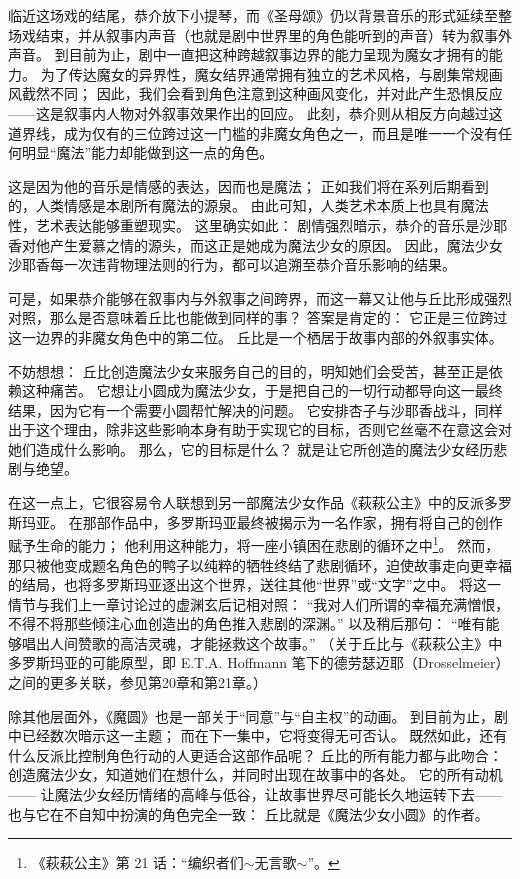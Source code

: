 临近这场戏的结尾，恭介放下小提琴，而《圣母颂》仍以背景音乐的形式延续至整场戏结束，并从叙事内声音（也就是剧中世界里的角色能听到的声音）转为叙事外声音。
到目前为止，剧中一直把这种跨越叙事边界的能力呈现为魔女才拥有的能力。
为了传达魔女的异界性，魔女结界通常拥有独立的艺术风格，与剧集常规画风截然不同；
因此，我们会看到角色注意到这种画风变化，并对此产生恐惧反应——这是叙事内人物对外叙事效果作出的回应。
此刻，恭介则从相反方向越过这道界线，成为仅有的三位跨过这一门槛的非魔女角色之一，而且是唯一一个没有任何明显“魔法”能力却能做到这一点的角色。

这是因为他的音乐是情感的表达，因而也是魔法；
正如我们将在系列后期看到的，人类情感是本剧所有魔法的源泉。
由此可知，人类艺术本质上也具有魔法性，艺术表达能够重塑现实。
这里确实如此：
剧情强烈暗示，恭介的音乐是沙耶香对他产生爱慕之情的源头，而这正是她成为魔法少女的原因。
因此，魔法少女沙耶香每一次违背物理法则的行为，都可以追溯至恭介音乐影响的结果。

可是，如果恭介能够在叙事内与外叙事之间跨界，而这一幕又让他与丘比形成强烈对照，那么是否意味着丘比也能做到同样的事？
答案是肯定的：
它正是三位跨过这一边界的非魔女角色中的第二位。
丘比是一个栖居于故事内部的外叙事实体。

不妨想想：
丘比创造魔法少女来服务自己的目的，明知她们会受苦，甚至正是依赖这种痛苦。
它想让小圆成为魔法少女，于是把自己的一切行动都导向这一最终结果，因为它有一个需要小圆帮忙解决的问题。
它安排杏子与沙耶香战斗，同样出于这个理由，除非这些影响本身有助于实现它的目标，否则它丝毫不在意这会对她们造成什么影响。
那么，它的目标是什么？
就是让它所创造的魔法少女经历悲剧与绝望。

在这一点上，它很容易令人联想到另一部魔法少女作品《萩萩公主》中的反派多罗斯玛亚\cite{ref33}。
在那部作品中，多罗斯玛亚最终被揭示为一名作家，拥有将自己的创作赋予生命的能力；
他利用这种能力，将一座小镇困在悲剧的循环之中\footnote{%
    《萩萩公主》第 21 话：“编织者们$\sim$无言歌$\sim$”。
}。
然而，那只被他变成题名角色的鸭子以纯粹的牺牲终结了悲剧循环，迫使故事走向更幸福的结局，也将多罗斯玛亚逐出这个世界，送往其他“世界”或“文字”之中。
将这一情节与我们上一章讨论过的虚渊玄后记相对照：
“我对人们所谓的幸福充满憎恨，不得不将那些倾注心血创造出的角色推入悲剧的深渊。”
以及稍后那句：
“唯有能够唱出人间赞歌的高洁灵魂，才能拯救这个故事。”
\cite{ref29}（关于丘比与《萩萩公主》中多罗斯玛亚的可能原型，即 E.T.A. Hoffmann 笔下的德劳瑟迈耶（Drosselmeier）之间的更多关联，参见第20章和第21章。）

除其他层面外，《魔圆》也是一部关于“同意”与“自主权”的动画。
到目前为止，剧中已经数次暗示这一主题；
而在下一集中，它将变得无可否认。
既然如此，还有什么反派比控制角色行动的人更适合这部作品呢？
丘比的所有能力都与此吻合：
创造魔法少女，知道她们在想什么，并同时出现在故事中的各处。
它的所有动机——
让魔法少女经历情绪的高峰与低谷，让故事世界尽可能长久地运转下去——
也与它在不自知中扮演的角色完全一致：
丘比就是《魔法少女小圆》的作者。
